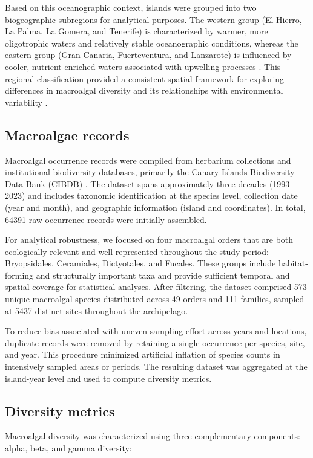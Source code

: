 \documentclass[a4paper,fleqn]{cas-sc}
\begin{document}
Based on this oceanographic context, islands were grouped into two biogeographic subregions for analytical purposes. The western group (El Hierro, La Palma, La Gomera, and Tenerife) is characterized by warmer, more oligotrophic waters and relatively stable oceanographic conditions, whereas the eastern group (Gran Canaria, Fuerteventura, and Lanzarote) is influenced by cooler, nutrient-enriched waters associated with upwelling processes \citep{Aristegui2009, Bianchi2012}. This regional classification provided a consistent spatial framework for exploring differences in macroalgal diversity and its relationships with environmental variability \citep{Duffy2019Toward}.

\subsection{Macroalgae records}

Macroalgal occurrence records were compiled from herbarium collections and institutional biodiversity databases, primarily the Canary Islands Biodiversity Data Bank (CIBDB) \citep{RIERA2015}. The dataset spans approximately three decades (1993-2023) and includes taxonomic identification at the species level, collection date (year and month), and geographic information (island and coordinates). In total, 64391 raw occurrence records were initially assembled.

For analytical robustness, we focused on four macroalgal orders that are both ecologically relevant and well represented throughout the study period: Bryopsidales, Ceramiales, Dictyotales, and Fucales. These groups include habitat-forming and structurally important taxa and provide sufficient temporal and spatial coverage for statistical analyses. After filtering, the dataset comprised 573 unique macroalgal species distributed across 49 orders and 111 families, sampled at 5437 distinct sites throughout the archipelago. 

To reduce bias associated with uneven sampling effort across years and locations, duplicate records were removed by retaining a single occurrence per species, site, and year. This procedure minimized artificial inflation of species counts in intensively sampled areas or periods. The resulting dataset was aggregated at the island-year level and used to compute diversity metrics.


\subsection{Diversity metrics}
Macroalgal diversity was characterized using three complementary components: alpha, beta, and gamma diversity: 
\end{document}
